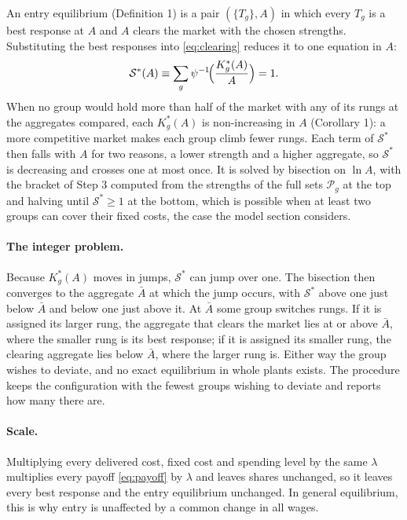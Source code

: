 \documentclass[11pt]{article}
\theoremstyle{remark}
\newcommand{\cP}{\mathcal P}
\begin{document}
An entry equilibrium (Definition 1) is a pair $(\{T_g\},A)$ in which every $T_g$ is a
best response at $A$ and $A$ clears the market with the chosen strengths. Substituting
the best responses into \eqref{eq:clearing} reduces it to one equation in $A$:
\begin{equation}
  \mathcal S^*(A)\equiv\sum_g\psi^{-1}\!\Bigl(\frac{K^*_g(A)}{A}\Bigr)=1 .
  \label{eq:entryclearing}
\end{equation}
When no group would hold more than half of the market with any of its rungs at the
aggregates compared, each $K^*_g(A)$ is non-increasing in $A$ (Corollary 1): a more
competitive market makes each group climb fewer rungs. Each term of $\mathcal S^*$
then falls with $A$ for two reasons, a lower strength and a higher aggregate, so
$\mathcal S^*$ is decreasing and crosses one at most once. It is solved by bisection
on $\ln A$, with the bracket of Step 3 computed from the strengths of the full sets
$\cP_g$ at the top and halving until $\mathcal S^*\ge1$ at the bottom, which is
possible when at least two groups can cover their fixed costs, the case the model
section considers.

\paragraph{The integer problem.} Because $K^*_g(A)$ moves in jumps, $\mathcal S^*$ can
jump over one. The bisection then converges to the aggregate $\bar A$ at which the
jump occurs, with $\mathcal S^*$ above one just below $\bar A$ and below one just above
it. At $\bar A$ some group switches rungs. If it is assigned its larger rung, the
aggregate that clears the market lies at or above $\bar A$, where the smaller rung is
its best response; if it is assigned its smaller rung, the clearing aggregate lies
below $\bar A$, where the larger rung is. Either way the group wishes to deviate, and no
exact equilibrium in whole plants exists. The procedure keeps the configuration with the fewest groups wishing to
deviate and reports how many there are.

\paragraph{Scale.} Multiplying every delivered cost, fixed cost and spending level by
the same $\lambda$ multiplies every payoff \eqref{eq:payoff} by $\lambda$ and leaves
shares unchanged, so it leaves every best response and the entry equilibrium
unchanged. In general equilibrium, this is why entry is unaffected by a common change
in all wages.
\end{document}
